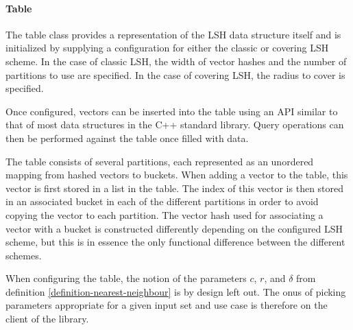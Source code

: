 \paragraph{Table} The table class provides a representation of the LSH data structure itself and is initialized by supplying a configuration for either the classic or covering LSH scheme. In the case of classic LSH, the width of vector hashes and the number of partitions to use are specified. In the case of covering LSH, the radius to cover is specified.

Once configured, vectors can be inserted into the table using an API similar to that of most data structures in the C++ standard library. Query operations can then be performed against the table once filled with data.

The table consists of several partitions, each represented as an unordered mapping from hashed vectors to buckets. When adding a vector to the table, this vector is first stored in a list in the table. The index of this vector is then stored in an associated bucket in each of the different partitions in order to avoid copying the vector to each partition. The vector hash used for associating a vector with a bucket is constructed differently depending on the configured LSH scheme, but this is in essence the only functional difference between the different schemes.

When configuring the table, the notion of the parameters $c$, $r$, and $\delta$ from definition \ref{definition-nearest-neighbour} is by design left out. The onus of picking parameters appropriate for a given input set and use case is therefore on the client of the library.

